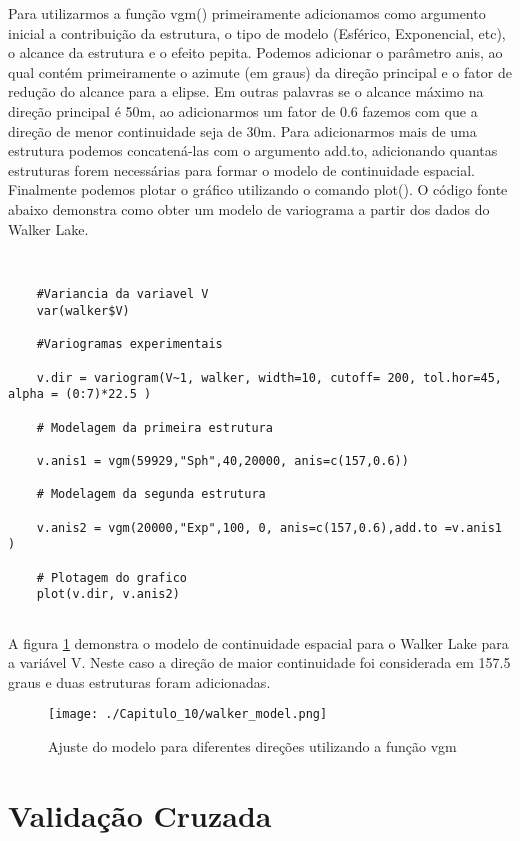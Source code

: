 Para utilizarmos a função vgm() primeiramente adicionamos como argumento inicial a contribuição da estrutura, o tipo de modelo (Esférico, Exponencial, etc), o alcance da estrutura e o efeito pepita. Podemos adicionar o parâmetro anis, ao qual contém primeiramente o azimute (em graus) da direção principal e o fator de redução do alcance para a elipse. Em outras palavras se o alcance máximo na direção principal é 50m, ao adicionarmos um fator de 0.6 fazemos com que a direção de menor continuidade seja de 30m. Para adicionarmos mais de uma estrutura podemos concatená-las com o argumento add.to, adicionando quantas estruturas forem necessárias para formar o modelo de continuidade espacial. Finalmente podemos plotar o gráfico utilizando o comando plot(). O código fonte abaixo demonstra como obter um modelo de variograma a partir dos dados do Walker Lake.

\begin{scriptsize}
	\estiloR
	\begin{lstlisting}[]
	
	
	#Variancia da variavel V
	var(walker$V)
	
	#Variogramas experimentais
	
	v.dir = variogram(V~1, walker, width=10, cutoff= 200, tol.hor=45, alpha = (0:7)*22.5 )
	
	# Modelagem da primeira estrutura 
	
	v.anis1 = vgm(59929,"Sph",40,20000, anis=c(157,0.6))
	
	# Modelagem da segunda estrutura 
	
	v.anis2 = vgm(20000,"Exp",100, 0, anis=c(157,0.6),add.to =v.anis1 )
	
	# Plotagem do grafico
	plot(v.dir, v.anis2)
	
	\end{lstlisting}
\end{scriptsize}

A figura \ref{ajuste_modelos} demonstra o modelo de continuidade espacial para o Walker Lake para a variável V. Neste caso a direção de maior continuidade foi considerada em 157.5 graus e duas estruturas foram adicionadas. 

\FloatBarrier
\begin{figure}[H]
	\centering
	\texttt{[image: ./Capitulo\_10/walker\_model.png]}	
	\caption{Ajuste do modelo para diferentes direções utilizando a função vgm}
	\label{ajuste_modelos}
\end{figure}
\FloatBarrier


\section{Validação Cruzada} 


